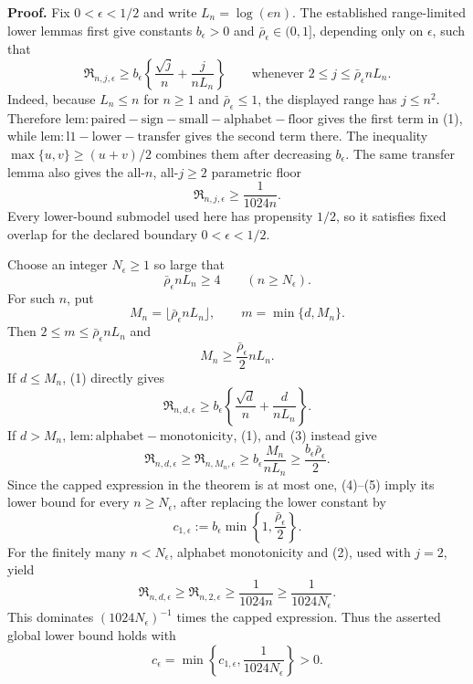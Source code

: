 \textbf{Proof.}
Fix \(0<\epsilon<1/2\) and write \(L_n=\log(en)\).  The established range-limited lower lemmas first give constants \(b_\epsilon>0\) and \(\bar\rho_\epsilon\in(0,1]\), depending only on \(\epsilon\), such that
\[
 \mathfrak R_{n,j,\epsilon}
 \geq b_\epsilon\left\{
   \frac{\sqrt j}{n}+\frac{j}{nL_n}
 \right\}
 \qquad
 \text{whenever }2\leq j\leq\bar\rho_\epsilon nL_n.
 \tag{1}
\]
Indeed, because \(L_n\leq n\) for \(n\geq1\) and \(\bar\rho_\epsilon\leq1\), the displayed range has \(j\leq n^2\).  Therefore \(\mathrm{lem:paired-sign-small-alphabet-floor}\) gives the first term in (1), while \(\mathrm{lem:l1-lower-transfer}\) gives the second term there.  The inequality \(\max\{u,v\}\geq(u+v)/2\) combines them after decreasing \(b_\epsilon\).  The same transfer lemma also gives the all-\(n\), all-\(j\geq2\) parametric floor
\[
 \mathfrak R_{n,j,\epsilon}\geq\frac1{1024n}.
 \tag{2}
\]
Every lower-bound submodel used here has propensity \(1/2\), so it satisfies fixed overlap for the declared boundary \(0<\epsilon<1/2\).

Choose an integer \(N_\epsilon\geq1\) so large that
\[
 \bar\rho_\epsilon nL_n\geq4
 \qquad(n\geq N_\epsilon).
\]
For such \(n\), put
\[
 M_n=\lfloor\bar\rho_\epsilon nL_n\rfloor,
 \qquad
 m=\min\{d,M_n\}.
\]
Then \(2\leq m\leq\bar\rho_\epsilon nL_n\) and
\[
 M_n\geq\frac{\bar\rho_\epsilon}{2}nL_n.
 \tag{3}
\]
If \(d\leq M_n\), (1) directly gives
\[
 \mathfrak R_{n,d,\epsilon}
 \geq b_\epsilon\left\{
   \frac{\sqrt d}{n}+\frac d{nL_n}
 \right\}.
 \tag{4}
\]
If \(d>M_n\), \(\mathrm{lem:alphabet-monotonicity}\), (1), and (3) instead give
\[
 \mathfrak R_{n,d,\epsilon}
 \geq\mathfrak R_{n,M_n,\epsilon}
 \geq b_\epsilon\frac{M_n}{nL_n}
 \geq\frac{b_\epsilon\bar\rho_\epsilon}{2}.
 \tag{5}
\]
Since the capped expression in the theorem is at most one, (4)--(5) imply its lower bound for every \(n\geq N_\epsilon\), after replacing the lower constant by
\[
 c_{1,\epsilon}
 :=b_\epsilon\min\left\{1,\frac{\bar\rho_\epsilon}{2}\right\}.
\]
For the finitely many \(n<N_\epsilon\), alphabet monotonicity and (2), used with \(j=2\), yield
\[
 \mathfrak R_{n,d,\epsilon}
 \geq\mathfrak R_{n,2,\epsilon}
 \geq\frac1{1024n}
 \geq\frac1{1024N_\epsilon}.
\]
This dominates \((1024N_\epsilon)^{-1}\) times the capped expression.  Thus the asserted global lower bound holds with
\[
 c_\epsilon
 =\min\left\{c_{1,\epsilon},\frac1{1024N_\epsilon}\right\}>0.
\]

